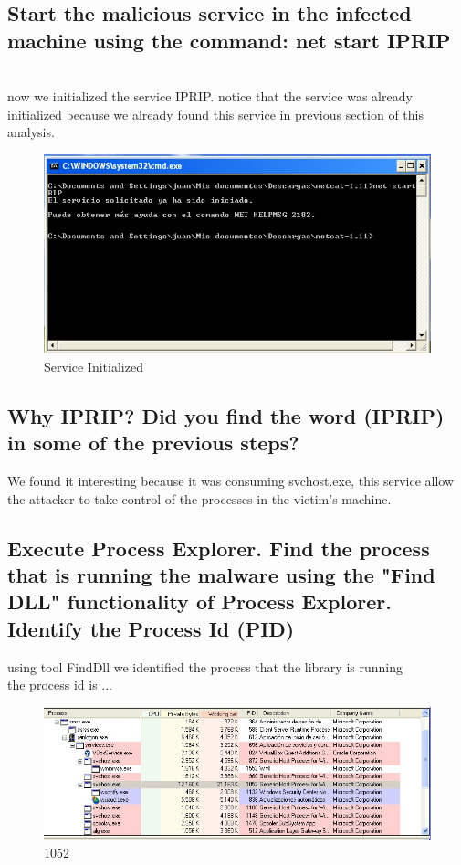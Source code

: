 \documentclass[12pt,letter]{article} %
\begin{document}
        \subsection{Start the malicious service in the infected machine using
        the command: net start IPRIP}

        \\ now we initialized the service IPRIP. notice that the service was
        already initialized because we already found this service in previous
        section of this analysis.
               \\

        \begin{figure}[h!]
            \centering
            \includegraphics[width=0.5\linewidth]{iprip.jpeg}
            \caption{Service Initialized}
            \label{IPRIP}
        \end{figure}


        \subsection{Why IPRIP? Did you find the word (IPRIP) in some of the
        previous steps?}

            We found it interesting because it was
            consuming svchost.exe, this service allow the attacker to take control
            of the processes in the  victim's machine.


        \subsection{Execute Process Explorer. Find the process that is running
        the malware using the "Find DLL" functionality of Process Explorer.
        Identify the Process Id (PID)}
            using tool FindDll we identified the process that the library is running
            \\
            the process id is ...
            \begin{figure}[h!]
                \centering
                \includegraphics[width=0.4\linewidth]{processid.jpeg}
                \caption{1052}
                \label{1052}
            \end{figure}
\end{document}
